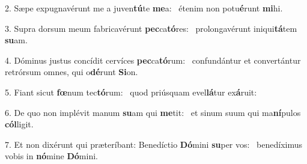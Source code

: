2. Sæpe expugnavérunt me a juven\textbf{tú}te \textbf{me}a: \ast\  étenim non potu\textbf{é}runt \textbf{mi}hi.\

3. Supra dorsum meum fabricavérunt \textbf{pec}ca\textbf{tó}res: \ast\  prolongavérunt iniqui\textbf{tá}tem \textbf{su}am.\

4. Dóminus justus concídit cervíces \textbf{pec}ca\textbf{tó}rum: \ast\  confundántur et convertántur retrórsum omnes, qui o\textbf{dé}runt \textbf{Si}on.\

5. Fiant sicut \textbf{fœ}num tec\textbf{tó}rum: \ast\  quod priúsquam evel\textbf{lá}tur ex\textbf{á}ruit:\

6. De quo non implévit manum \textbf{su}am qui \textbf{me}tit: \ast\  et sinum suum qui ma\textbf{ní}pulos \textbf{cól}ligit.\

7. Et non dixérunt qui præteríbant: Benedíctio \textbf{Dó}mini \textbf{su}per vos: \ast\  benedíximus vobis in \textbf{nó}mine \textbf{Dó}mini.\

